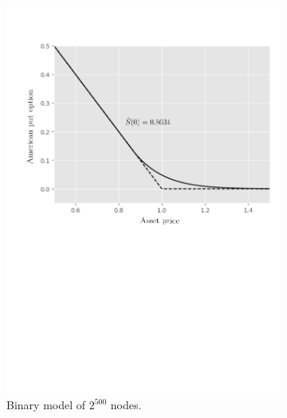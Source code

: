 \begin{figure}[H]
  \centering
  \begin{subfigure}{0.435\textwidth}
    \label{fig:finitedifferencesschemes:numericaresults:test_case_2_implicit_bopm}
    \centering
    \includegraphics[width=\textwidth]{chapters/chapter3/TestCase2BOPM.pdf}
    \caption{Binary model of $2^{500}$ nodes.}
    \vspace{0.5cm}
  \end{subfigure}
  \begin{subfigure}{0.4\textwidth}
    \label{fig:finitedifferencesschemes:numericaresults:test_case_2_implicit_nielsen}
    \centering

\end{subfigure}
\end{figure}
